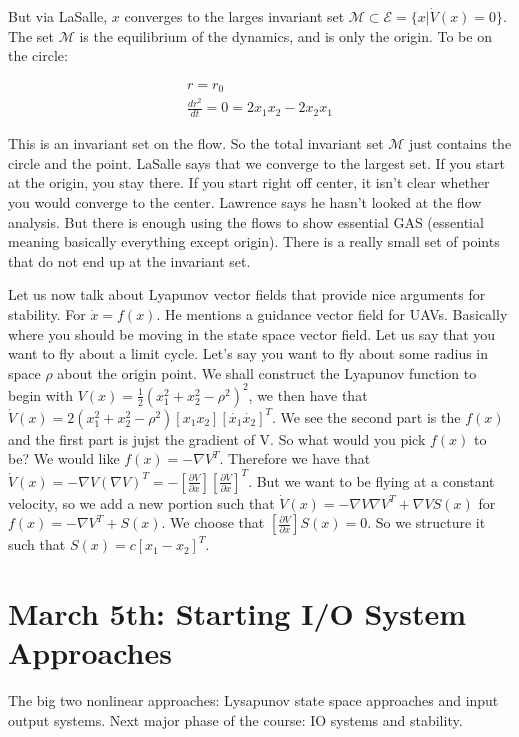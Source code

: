 \documentclass[11pt]{article}
\begin{document}
But via LaSalle, $x$ converges to the larges invariant set $\mathcal{M} \subset \mathcal{E} = \{  x \rvert \dot{V}(x) = 0 \}$. The set $\mathcal{M}$ is the equilibrium of the dynamics, and is only the origin. To be on the circle:

\begin{align}
r = r_0 \\
\frac{d r^2}{dt} = 0  = 2x_1x_2 - 2x_2x_1
\end{align}

This is an invariant set on the flow. So the total invariant set $\mathcal{M}$ just contains the circle and the point. LaSalle says that we converge to the largest set. If you start at the origin, you stay there. If you start right off center, it isn't clear whether you would converge to the center. Lawrence says he hasn't looked at the flow analysis. But there is enough using the flows to show essential GAS (essential meaning basically everything except origin). There is a really small set of points that do not end up at the invariant set.

Let us now talk about Lyapunov vector fields that provide nice arguments for stability. For $\dot{x} = f(x)$. He mentions a guidance vector field for UAVs. Basically where you should be moving in the state space vector field. Let us say that you want to fly about a limit cycle. Let's say you want to fly about some radius in space $\rho$ about the origin point. We shall construct the Lyapunov function to begin with $V(x) = \frac{1}{2} (x_1^2 +x_2^2 - \rho^2)^2$, we then have that $\dot{V}(x) = 2(x_1^2 + x_2^2 - \rho^2) [x_1 x_2] [\dot{x_1} \dot{x_2}]^T$. We see the second part is the $f(x)$ and the first part is jujst the gradient of V. So what would you pick $f(x)$ to be? We would like $f(x) = -\nabla V ^T$. Therefore we have that $\dot{V}(x) = - \nabla V (\nabla V)^T = -[\frac{\partial V}{\partial x}][\frac{\partial V}{\partial x}]^T$. But we want to be flying at a constant velocity, so we add a new portion such that $\dot{V}(x) = - \nabla V \nabla V^T + \nabla V S(x)$ for $f(x) = -\nabla V ^T + S(x)$. We choose that $[\frac{\partial V}{\partial x}]S(x) = 0$. So we structure it such that $S(x) = c [x_1 -x_2]^T$.
 


\section{March 5th: Starting I/O System Approaches}
The big two nonlinear approaches: Lysapunov state space approaches and input output systems. Next major phase of the course: IO systems and stability.
\end{document}
